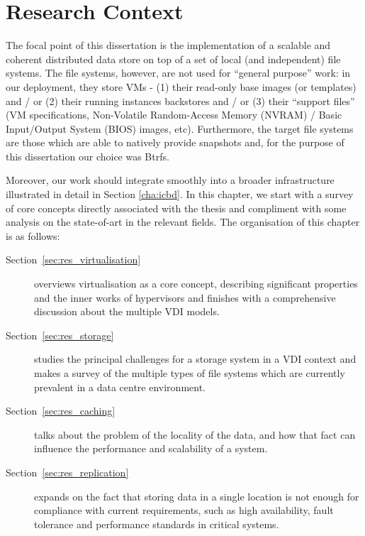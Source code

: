 
\chapter{Research Context}
\label{cha:research_context}

The focal point of this dissertation is the implementation of a scalable and coherent distributed data store on top of a set of local (and independent) file systems. The file systems, however, are not used for ``general purpose'' work: in our deployment, they store VMs - (1) their read-only base images (or templates) and / or (2) their running instances backstores and / or (3) their ``support files'' (VM specifications, Non-Volatile Random-Access Memory (NVRAM) / Basic Input/Output System (BIOS) images, etc).
Furthermore, the target file systems are those which are able to natively provide snapshots and, for the purpose of this dissertation our choice was Btrfs.


 
 Moreover, our work should integrate smoothly into a broader infrastructure illustrated in detail in Section \ref{cha:icbd}.
In this chapter, we start with a survey of core concepts directly associated with the thesis and compliment with some analysis on the state-of-art in the relevant fields. The organisation of this chapter is as follows:

\begin{description}
	\item [Section~\ref{sec:res_virtualisation}] overviews virtualisation as a core concept, describing significant properties and the inner works of hypervisors and finishes with a comprehensive discussion about the multiple VDI models.
	\item [Section~\ref{sec:res_storage}] studies the principal challenges for a storage system in a VDI context and makes a survey of the multiple types of file systems which are currently prevalent in a data centre environment. 
	\item [Section~\ref{sec:res_caching}] talks about the problem of the locality of the data, and how that fact can influence the performance and scalability of a system.
	\item [Section~\ref{sec:res_replication}] expands on the fact that storing data in a single location is not enough for compliance with current requirements, such as high availability, fault tolerance and performance standards in critical systems.
\end{description}

